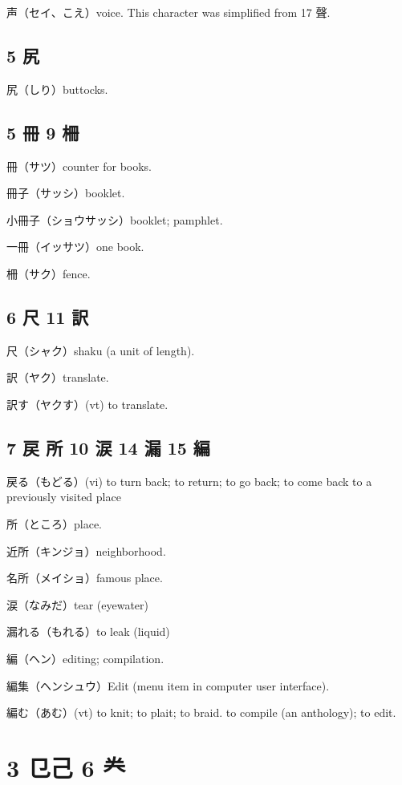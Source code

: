 声（セイ、こえ）voice.
This character was simplified from 17 聲.

\subsection{5 尻}

尻（しり）buttocks.

\subsection{5 冊 9 柵}

冊（サツ）counter for books.

冊子（サッシ）booklet.

小冊子（ショウサッシ）booklet; pamphlet.

一冊（イッサツ）one book.

柵（サク）fence.

\subsection{6 尺 11 訳}

尺（シャク）shaku (a unit of length).

訳（ヤク）translate.

訳す（ヤクす）(vt) to translate.

\subsection{7 戻 所 10 涙 14 漏 15 編}

戻る（もどる）(vi) to turn back; to return; to go back;
to come back to a previously visited place

所（ところ）place.

近所（キンジョ）neighborhood.

名所（メイショ）famous place.

涙（なみだ）tear (eyewater)

漏れる（もれる）to leak (liquid)

編（ヘン）editing; compilation.

編集（ヘンシュウ）Edit (menu item in computer user interface).

編む（あむ）(vt)
to knit; to plait; to braid.
to compile (an anthology); to edit.

\section{3 㔾己 6 龹}

